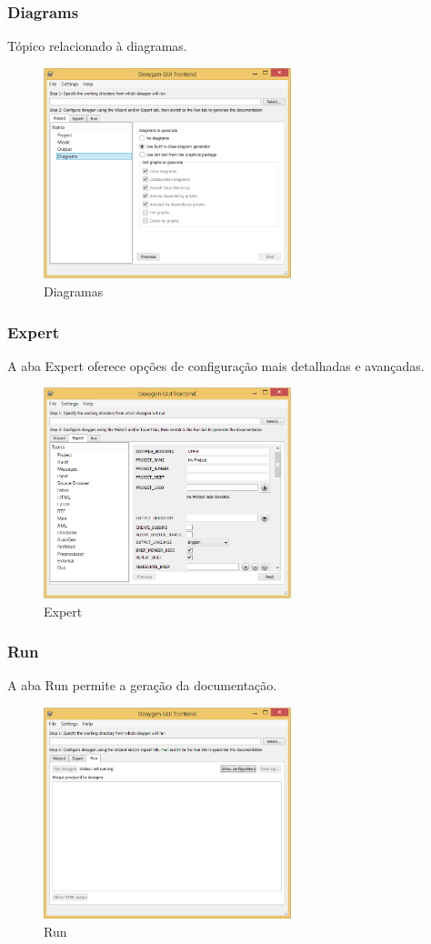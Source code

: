 \subsubsection{Diagrams}
Tópico relacionado à diagramas.
\begin{figure}[!htb]
\centering
\includegraphics[width=7.2cm]{./include/chapters/sections/soft/section4/img/diagrams.png}
\caption{Diagramas}
\end{figure}

\subsubsection{Expert}

A aba Expert oferece opções de configuração mais detalhadas e avançadas.
\begin{figure}[!htb]
\centering
\includegraphics[width=7.2cm]{./include/chapters/sections/soft/section4/img/expert.png}
\caption{Expert}
\end{figure}

\subsubsection{Run}

A aba Run permite a geração da documentação.
\begin{figure}[!htb]
\centering
\includegraphics[width=7.2cm]{./include/chapters/sections/soft/section4/img/run.png}
\caption{Run}
\end{figure}